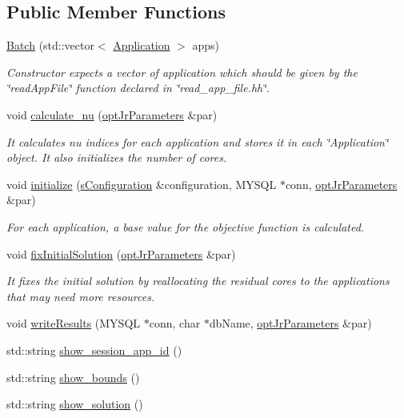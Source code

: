 \subsection*{Public Member Functions}
\begin{DoxyCompactItemize}
\item 
\hyperlink{classBatch_aea459d16c99c2f02af53b3ad5b0ff12d}{Batch} (std\-::vector$<$ \hyperlink{classApplication}{Application} $>$ apps)
\begin{DoxyCompactList}\small\item\em Constructor expects a vector of application which should be given by the \char`\"{}read\-App\-File\char`\"{} function declared in \char`\"{}read\-\_\-app\-\_\-file.\-hh\char`\"{}. \end{DoxyCompactList}\item 
void \hyperlink{classBatch_a14f132321413b45d6446200807451414}{calculate\-\_\-nu} (\hyperlink{classoptJrParameters}{opt\-Jr\-Parameters} \&par)
\begin{DoxyCompactList}\small\item\em It calculates nu indices for each application and stores it in each \char`\"{}\-Application\char`\"{} object. It also initializes the number of cores. \end{DoxyCompactList}\item 
void \hyperlink{classBatch_ae212d22fa812b51160f57507242152c1}{initialize} (\hyperlink{readConfigurationFile_8hh_ab8f35b1da3261263c5e9c0e7c8921f5c}{s\-Configuration} \&configuration, M\-Y\-S\-Q\-L $\ast$conn, \hyperlink{classoptJrParameters}{opt\-Jr\-Parameters} \&par)
\begin{DoxyCompactList}\small\item\em For each application, a base value for the objective function is calculated. \end{DoxyCompactList}\item 
void \hyperlink{classBatch_ac50dad870490ca7c60e0e15d86c02614}{fix\-Initial\-Solution} (\hyperlink{classoptJrParameters}{opt\-Jr\-Parameters} \&par)
\begin{DoxyCompactList}\small\item\em It fixes the initial solution by reallocating the residual cores to the applications that may need more resources. \end{DoxyCompactList}\item 
void \hyperlink{classBatch_a4c6c23dd95eccc220115af294d481219}{write\-Results} (M\-Y\-S\-Q\-L $\ast$conn, char $\ast$db\-Name, \hyperlink{classoptJrParameters}{opt\-Jr\-Parameters} \&par)
\item 
std\-::string \hyperlink{classBatch_a7bb052d7d9fd3cfe1a00ebd60f977afb}{show\-\_\-session\-\_\-app\-\_\-id} ()
\item 
std\-::string \hyperlink{classBatch_a6e3c7278556780b9fb1e530c740b41de}{show\-\_\-bounds} ()
\item 
std\-::string \hyperlink{classBatch_a54f580f3d93657bdf72420d338551087}{show\-\_\-solution} ()
\end{DoxyCompactItemize}
